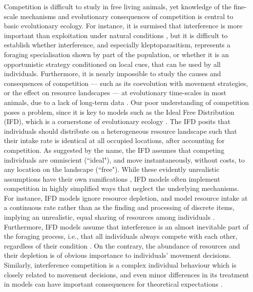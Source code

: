 \documentclass[11pt]{article}
\begin{document}
Competition is difficult to study in free living animals, yet knowledge of the fine-scale mechanisms and evolutionary consequences of competition is central to basic evolutionary ecology.
For instance, it is surmised that interference is more important than exploitation under natural conditions \citep[see][]{case1974}, but it is difficult to establish whether interference, and especially kleptoparasitism, represents a foraging specialisation shown by part of the population, or whether it is an opportunistic strategy conditioned on local cues, that can be used by all individuals.
Furthermore, it is nearly impossible to study the causes and consequences of competition --- such as its coevolution with movement strategies, or the effect on resource landscapes --- at evolutionary time-scales in most animals, due to a lack of long-term data \citep{clutton-brock2010}.
Our poor understanding of competition poses a problem, since it is key to models such as the Ideal Free Distribution (IFD), which is a cornerstone of evolutionary ecology \citep{fretwell1970}.
The IFD posits that individuals should distribute on a heterogeneous resource landscape such that their intake rate is identical at all occupied locations, after accounting for competition.
As suggested by the name, the IFD assumes that competing individuals are omniscient (``ideal"), and move instantaneously, without costs, to any location on the landscape (``free").
While these evidently unrealistic assumptions have their own ramifications \citep{tregenza1995,amano2006,matsumura2010,cressman2006}, IFD models often implement competition in highly simplified ways that  neglect the underlying mechanisms.
For instance, IFD models ignore resource depletion, and model resource intake at a continuous rate rather than as the finding and processing of discrete items, implying an unrealistic, equal sharing of resources among individuals \citep{fretwell1970,vandermeer1997,cressman2006}.
Furthermore, IFD models assume that interference is an almost inevitable part of the foraging process, i.e., that all individuals always compete with each other, regardless of their condition \citep[for instance, handling prey items; reviewed in][see also \citealt{cressman2006, garay2020}]{vandermeer1997, tregenza1995}.
On the contrary, the abundance of resources and their depletion is of obvious importance to individuals' movement decisions.
Similarly, interference competition is a complex individual behaviour which is closely related to movement decisions, and even minor differences in its treatment in models can have important  consequences for theoretical expectations \citep{vandermeer1997}.
\end{document}
